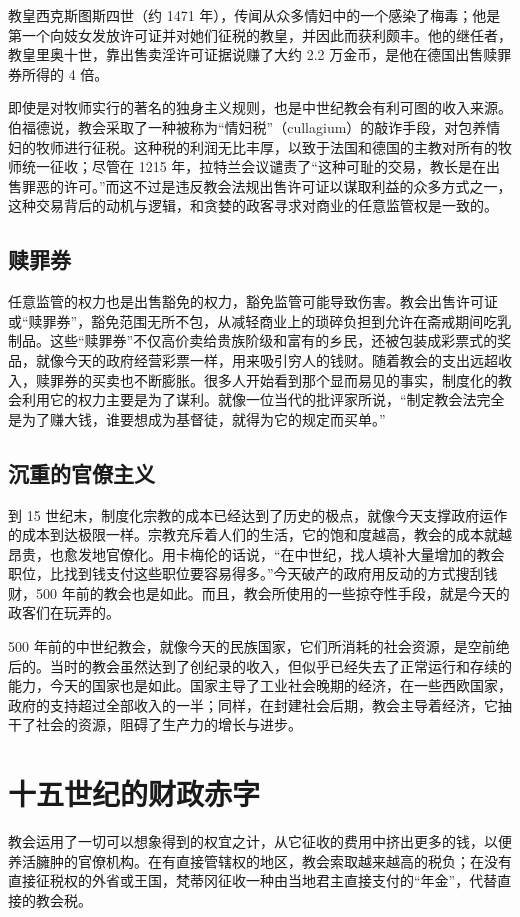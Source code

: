 \begin{tcolorbox}
\kaishu 教皇西克斯图斯四世（约 1471 年），传闻从众多情妇中的一个感染了梅毒；他是第一个向妓女发放许可证并对她们征税的教皇，并因此而获利颇丰。他的继任者，教皇里奥十世，靠出售卖淫许可证据说赚了大约 2.2 万金币，是他在德国出售赎罪券所得的 4 倍。
\end{tcolorbox}


即使是对牧师实行的著名的独身主义规则，也是中世纪教会有利可图的收入来源。伯福德说，教会采取了一种被称为“情妇税”（cullagium）的敲诈手段，对包养情妇的牧师进行征税。这种税的利润无比丰厚，以致于法国和德国的主教对所有的牧师统一征收；尽管在 1215 年，拉特兰会议谴责了“这种可耻的交易，教长是在出售罪恶的许可。”而这不过是违反教会法规出售许可证以谋取利益的众多方式之一，这种交易背后的动机与逻辑，和贪婪的政客寻求对商业的任意监管权是一致的。

\subsection{赎罪券}
任意监管的权力也是出售豁免的权力，豁免监管可能导致伤害。教会出售许可证或“赎罪券”，豁免范围无所不包，从减轻商业上的琐碎负担到允许在斋戒期间吃乳制品。这些“赎罪券”不仅高价卖给贵族阶级和富有的乡民，还被包装成彩票式的奖品，就像今天的政府经营彩票一样，用来吸引穷人的钱财。随着教会的支出远超收入，赎罪券的买卖也不断膨胀。很多人开始看到那个显而易见的事实，制度化的教会利用它的权力主要是为了谋利。就像一位当代的批评家所说，“制定教会法完全是为了赚大钱，谁要想成为基督徒，就得为它的规定而买单。”

\subsection{沉重的官僚主义}
到 15 世纪末，制度化宗教的成本已经达到了历史的极点，就像今天支撑政府运作的成本到达极限一样。宗教充斥着人们的生活，它的饱和度越高，教会的成本就越昂贵，也愈发地官僚化。用卡梅伦的话说，“在中世纪，找人填补大量增加的教会职位，比找到钱支付这些职位要容易得多。”今天破产的政府用反动的方式搜刮钱财，500 年前的教会也是如此。而且，教会所使用的一些掠夺性手段，就是今天的政客们在玩弄的。

500 年前的中世纪教会，就像今天的民族国家，它们所消耗的社会资源，是空前绝后的。当时的教会虽然达到了创纪录的收入，但似乎已经失去了正常运行和存续的能力，今天的国家也是如此。国家主导了工业社会晚期的经济，在一些西欧国家，政府的支持超过全部收入的一半；同样，在封建社会后期，教会主导着经济，它抽干了社会的资源，阻碍了生产力的增长与进步。

\section{十五世纪的财政赤字}
教会运用了一切可以想象得到的权宜之计，从它征收的费用中挤出更多的钱，以便养活臃肿的官僚机构。在有直接管辖权的地区，教会索取越来越高的税负；在没有直接征税权的外省或王国，梵蒂冈征收一种由当地君主直接支付的“年金”，代替直接的教会税。

